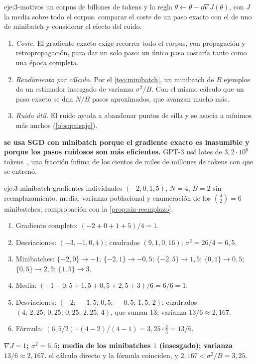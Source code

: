 \begin{solucion}{eje:3-motivos}
\datos un corpus de billones de tokens y la regla $\theta\leftarrow\theta-\eta\nabla J(\theta)$, con $J$ la media sobre todo el corpus.
\planteamiento comparar el coste de un paso exacto con el de uno de minibatch y considerar el efecto del ruido.
\pasos
\begin{enumerate}[label=\arabic*.]
  \item \emph{Coste.} El gradiente exacto exige recorrer todo el corpus, con propagación y retropropagación, para dar un solo paso: un único paso costaría tanto como una época completa.
  \item \emph{Rendimiento por cálculo.} Por el \cref{teo:minibatch}, un minibatch de $B$ ejemplos da un estimador insesgado de varianza $\sigma^{2}/B$. Con el mismo cálculo que un paso exacto se dan $N/B$ pasos aproximados, que avanzan mucho más.
  \item \emph{Ruido útil.} El ruido ayuda a abandonar puntos de silla y se asocia a mínimos más anchos (\cref{obs:paisaje}).
\end{enumerate}
\resultado \textbf{se usa SGD con minibatch porque el gradiente exacto es inasumible y porque los pasos ruidosos son más eficientes.}
\comprobacion GPT-3 usó lotes de $3{,}2\cdot 10^{6}$ tokens~\cite[tabla~2.1]{gpt3}, una fracción ínfima de los cientos de miles de millones de tokens con que se entrenó.
\end{solucion}

\begin{solucion}{eje:3-minibatch}
\datos gradientes individuales $(-2,0,1,5)$, $N=4$, $B=2$ sin reemplazamiento.
\planteamiento media, varianza poblacional y enumeración de los $\binom42=6$ minibatches; comprobación con la \cref{prop:sin-reemplazo}.
\pasos
\begin{enumerate}[label=\arabic*.]
  \item Gradiente completo: $(-2+0+1+5)/4=1$.
  \item Desviaciones: $(-3,-1,0,4)$; cuadrados $(9,1,0,16)$; $\sigma^{2}=26/4=6{,}5$.
  \item Minibatches: $\{-2,0\}\to-1$; $\{-2,1\}\to-0{,}5$; $\{-2,5\}\to 1{,}5$; $\{0,1\}\to 0{,}5$; $\{0,5\}\to 2{,}5$; $\{1,5\}\to 3$.
  \item Media: $(-1-0{,}5+1{,}5+0{,}5+2{,}5+3)/6=6/6=1$.
  \item Desviaciones: $(-2;\,-1{,}5;\,0{,}5;\,-0{,}5;\,1{,}5;\,2)$; cuadrados $(4;\,2{,}25;\,0{,}25;\,0{,}25;\,2{,}25;\,4)$, que suman 13; varianza $13/6\approx 2{,}167$.
  \item Fórmula: $(6{,}5/2)\cdot(4-2)/(4-1)=3{,}25\cdot\frac23=13/6$.
\end{enumerate}
\resultado \textbf{$\nabla J=1$; $\sigma^{2}=6{,}5$; media de los minibatches $1$ (insesgado); varianza $13/6\approx 2{,}167$.}
\comprobacion el cálculo directo y la fórmula coinciden, y $2{,}167<\sigma^{2}/B=3{,}25$.
\end{solucion}

